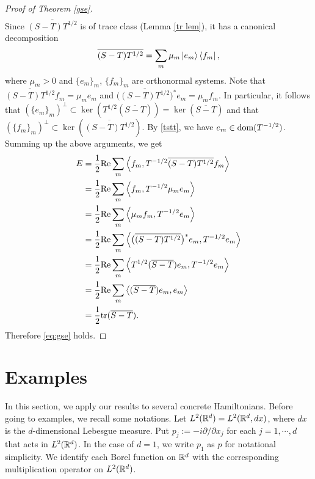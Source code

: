 \documentclass[12pt]{article}
\theoremstyle{plain}
\numberwithin{equation}{section}
\theoremstyle{remark}
\begin{document}
\begin{proof}[Proof of Theorem \ref{gse}]
\begin{align}
\end{align}
Since $\overline{(S-T)T^{1/2}}$ is of trace class (Lemma \ref{tr lem}), it has a canonical decomposition
\begin{align*}
  \overline{(S-T)T^{1/2}} = \sum_m \mu_m \ket{e_m} \bra{f_m},
\end{align*}
where $\mu_m > 0$ and $\{e_m\}_m$, $\{f_m\}_m$ are orthonormal systems.
Note that $\overline{(S-T)T^{1/2}}f_m = \mu_m e_m$ and $\big(\overline{(S-T)T^{1/2}}\big)^* e_m = \mu_m f_m$.
In particular, it follows that $(\{e_m\}_m)^\perp\subset\ker(T^{1/2}(\overline{S-T}))=\ker(\overline{S-T})$ 
and that $(\{f_m\}_m)^\perp\subset\ker(\overline{(S-T)T^{1/2}})$.
By \eqref{tstt}, we have $e_m \in \mathop{\mathrm{dom}}(T^{-1/2})$.
Summing up the above arguments, we get
\begin{align*}
E &= \frac{1}{2} \mathrm{Re} \sum_m\left\langle f_m,T^{-1/2}\overline{(S-T)T^{1/2}}f_m\right\rangle \\
&= \frac{1}{2} \mathrm{Re} \sum_m \left\langle f_m,T^{-1/2} \mu_m e_m\right\rangle \\
&= \frac{1}{2} \mathrm{Re} \sum_m \left\langle\mu_m f_m,T^{-1/2} e_m\right\rangle \\
&= \frac{1}{2} \mathrm{Re} \sum_m \left\langle\big(\overline{(S-T)T^{1/2}}\big)^* e_m,T^{-1/2} e_m\right\rangle \\
&= \frac{1}{2} \mathrm{Re} \sum_m \left\langle T^{1/2}(\overline{S-T}) e_m,T^{-1/2} e_m\right\rangle \\
&= \frac{1}{2} \mathrm{Re} \sum_m \left\langle(\overline{S-T})e_m,e_m\right\rangle \\
&= \frac{1}{2} \mathrm{tr}(\overline{S-T}).
\end{align*}
Therefore \eqref{eq:gse} holds.
\end{proof}





\section{Examples}{\label{examples}}
In this section, we apply our results to several concrete Hamiltonians.
Before going to examples, we recall some notations.
Let $L^2(\mathbb{R}^d)=L^2(\mathbb{R}^d,dx)$, where $dx$ is the $d$-dimensional Lebesgue measure.
Put $p_j:=-i\partial/\partial x_j$ for each $j=1,\cdots,d$ that acts in $L^2(\mathbb{R}^d)$.
In the case of $d=1$, we write $p_1$ as $p$ for notational simplicity.
We identify each Borel function on $\mathbb{R}^d$ with the corresponding multiplication operator on $L^2(\mathbb{R}^d)$.
\end{document}
